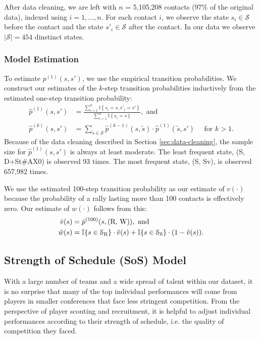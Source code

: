 \documentclass[USenglish]{article}
\theoremstyle{dgthm}
\theoremstyle{dgdef}
\begin{document}
{After data cleaning, we are left with $n$ = 5,105,208 contacts (97\% of the original data), indexed using $i = 1, ..., n$. For each contact $i$, we observe the state $s_i \in \mathcal{S}$ before the contact and the state $s'_i \in \mathcal{S}$ after the contact. In our data we observe $|\mathcal{S}| = 454$ dinstinct states.

\subsubsection{Model Estimation}

To estimate $p^{(1)}(s, s')$, we use the empirical transition probabilities. We construct our estimates of the $k$-step transition probabilities inductively from the estimated one-step transition probability:
\begin{align*}
  \hat p^{(1)}(s, s') &= \frac
    {\sum_{i = 1}^n \mathbb{I}\left\{s_i = s, s'_i = s'\right\}}
    {\sum_{i = 1}^n \mathbb{I}\left\{s_i = s\right\}},\mbox{ and}\\
  \hat p^{(k)}(s, s') &= \sum_{\tilde s \in \mathcal{S}} \hat p^{(k-1)}(s, \tilde s) \cdot \hat p^{(1)}(\tilde s, s') \quad \mbox{ for }k > 1.
\end{align*}
Because of the data cleaning described in Section \ref{sec:data-cleaning}, the sample size for $\hat p^{(1)}(s, s')$ is always at least moderate. The least frequent state, (S, D+St\#AX0) is observed 93 times. The most frequent state, (S, Sv), is observed 657,982 times.

We use the estimated 100-step transition probability as our estimate of $v(\cdot)$ because the probability of a rally lasting more than 100 contacts is effectively zero. Our estimate of $w(\cdot)$ follows from this:
\begin{align*}
  \hat v(s) &= \hat p^{(100)}(s, \mbox{(R, W)}),\mbox{ and}\\
  \hat w(s) &= \mathbb{I}\{s \in \mathcal{S}_{\mbox{\scriptsize R}}\} \cdot \hat v(s) + \mathbb{I}\{s \in \mathcal{S}_{\mbox{\scriptsize S}}\} \cdot (1 - \hat v(s)).
\end{align*}
}

\subsection{Strength of Schedule (SoS) Model}
\label{sec:strength-of-schedule}

With a large number of teams and a wide spread of talent within our dataset, it is no surprise that many of the top individual performances will come from players in smaller conferences that face less stringent competition. From the perspective of player scouting and recruitment, it is helpful to adjust individual performances according to their strength of schedule, i.e. the quality of competition they faced.
\end{document}
